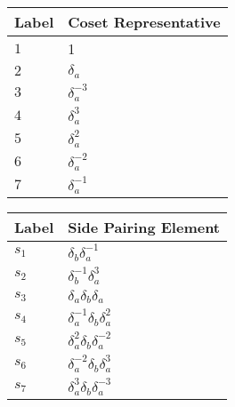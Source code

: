 \documentclass{article}
\begin{document}
\begin{center}
\begin{tabular}{ll}
\toprule
Label & Coset Representative\\
\midrule
$1$ & 1 \\
$2$ & $\delta_a^{}$ \\
$3$ & $\delta_a^{-3}$ \\
$4$ & $\delta_a^{3}$ \\
$5$ & $\delta_a^{2}$ \\
$6$ & $\delta_a^{-2}$ \\
$7$ & $\delta_a^{-1}$ \\
\bottomrule
\end{tabular}
\hfill
\begin{tabular}{ll}
\toprule
Label & Side Pairing Element\\
\midrule
$s_{1}$ & $\delta_b^{}\delta_a^{-1}$ \\
$s_{2}$ & $\delta_b^{-1}\delta_a^{3}$ \\
$s_{3}$ & $\delta_a^{}\delta_b^{}\delta_a^{}$ \\
$s_{4}$ & $\delta_a^{-1}\delta_b^{}\delta_a^{2}$ \\
$s_{5}$ & $\delta_a^{2}\delta_b^{}\delta_a^{-2}$ \\
$s_{6}$ & $\delta_a^{-2}\delta_b^{}\delta_a^{3}$ \\
$s_{7}$ & $\delta_a^{3}\delta_b^{}\delta_a^{-3}$ \\
\bottomrule
\end{tabular}
\end{center}

\thispagestyle{empty}
\end{document}
